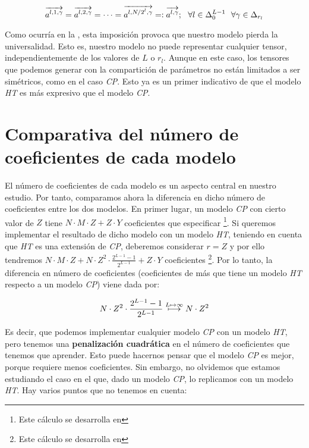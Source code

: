 \begin{equation}
	\overrightarrow{a^{l, 1, \gamma}} = \overrightarrow{a^{l, 2, \gamma}} = \cdots = \overrightarrow{a^{l, N/2^l, \gamma}} =: \overrightarrow{a^{l, \gamma}}; \ \  \forall l \in \Delta_{0}^{L - 1} \ \  \forall \gamma \in \Delta_{r_l}
\end{equation}

Como ocurría en la , esta imposición provoca que nuestro modelo pierda la universalidad. Esto es, nuestro modelo no puede representar cualquier tensor, independientemente de los valores de $L$ o $r_l$. Aunque en este caso, los tensores que podemos generar con la compartición de parámetros no están limitados a ser simétricos, como en el caso \textit{CP}. Esto ya es un primer indicativo de que el modelo \textit{HT} es más expresivo que el modelo \textit{CP}.

\section{Comparativa del número de coeficientes de cada modelo}

El número de coeficientes de cada modelo es un aspecto central en nuestro estudio. Por tanto, comparamos ahora la diferencia en dicho número de coeficientes entre los dos modelos. En primer lugar, un modelo \textit{CP} con cierto valor de $Z$ tiene  $N \cdot M \cdot Z + Z \cdot Y$ coeficientes que especificar \footnote{Este cálculo se desarrolla en }. Si queremos implementar el resultado de dicho modelo con un modelo \textit{HT}, teniendo en cuenta que \textit{HT} es una extensión de \textit{CP}, deberemos considerar $r = Z$ y por ello tendremos $N \cdot M \cdot Z + N \cdot Z^2 \cdot \frac{2^{L-1} - 1}{2^{L-1}} + Z \cdot Y$ coeficientes \footnote{Este cálculo se desarrolla en }. Por lo tanto, la diferencia en número de coeficientes (coeficientes de más que tiene un modelo \textit{HT} respecto a un modelo \textit{CP}) viene dada por:

\begin{equation}
	N \cdot Z^2 \cdot \frac{2^{L-1} - 1}{2^{L-1}} \stackrel{L \mapsto \infty}{\longmapsto} N \cdot Z^2
\end{equation}

Es decir, que podemos implementar cualquier modelo \textit{CP} con un modelo \textit{HT}, pero tenemos una \textbf{penalización cuadrática} en el número de coeficientes que tenemos que aprender. Esto puede hacernos pensar que el modelo \textit{CP} es mejor, porque requiere menos coeficientes. Sin embargo, no olvidemos que estamos estudiando el caso en el que, dado un modelo \textit{CP}, lo replicamos con un modelo \textit{HT}. Hay varios puntos
que no tenemos en cuenta:

